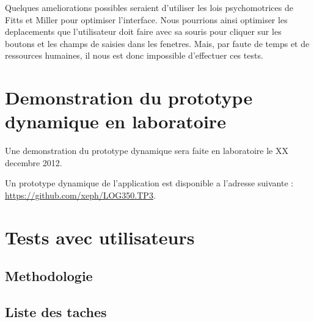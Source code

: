 \documentclass[letterpaper, oneside, 12pt, these, creativecommons]{thETS}
\begin{document}
Quelques ameliorations possibles seraient d'utiliser les lois psychomotrices de Fitts et Miller pour optimiser l'interface. Nous pourrions ainsi optimiser les deplacements que l'utilisateur doit faire avec sa souris pour cliquer sur les boutons et les champs de saisies dans les fenetres. Mais, par faute de temps et de ressources humaines, il nous est donc impossible d'effectuer ces tests.

\chapter{Demonstration du prototype dynamique en laboratoire}

Une demonstration du prototype dynamique sera faite en laboratoire le XX decembre 2012.

Un prototype dynamique de l'application est disponible a l'adresse suivante : 
\url{https://github.com/xeph/LOG350.TP3}.

\chapter{Tests avec utilisateurs}

\section{Methodologie}

\newpage

\section{Liste des taches}
\end{document}
